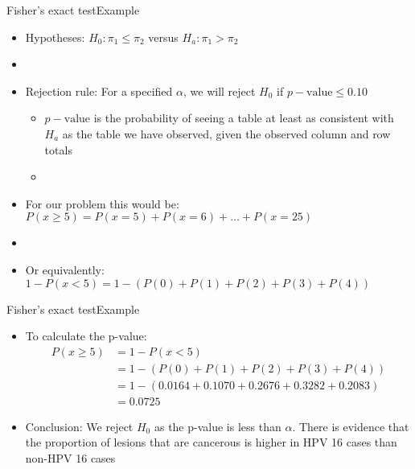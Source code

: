 \documentclass[xcolor=dvipsnames]{beamer}
\begin{document}
\begin{frame}{Fisher's exact test}{Example}
	\begin{itemize}
		\item Hypotheses: $H_0: \pi_1 \leq \pi_2$ versus $H_a: \pi_1 > \pi_2$
		\item[]
		\item Rejection rule: For a specified $\alpha$, we will reject $H_0$ if $p-\text{value} \leq 0.10$
		\begin{itemize}
			\item $p-\text{value}$ is the probability of seeing a table at least as consistent with $H_a$ as the table we have observed, given the observed column and row totals
			\item[]
		\end{itemize}
	\item For our problem this would be: $P(x \geq 5) = P(x = 5)+P(x = 6)+\hdots + P(x = 25)$
	\item[]
	\item Or equivalently:
	$1-P(x < 5) = 1-(P(0) + P(1) + P(2) + P(3) + P(4))$
	\end{itemize}
\end{frame}

\begin{frame}{Fisher's exact test}{Example}
	\begin{itemize}
		\item To calculate the p-value:
		\begin{align*}
			P(x \geq 5) &= 1-P(x < 5) \\
			&=1-(P(0) + P(1) + P(2) + P(3) + P(4)) \\ 
			&=1-(0.0164 + 0.1070 + 0.2676 + 0.3282 + 0.2083)  \\
			&=0.0725
		\end{align*}
		\item Conclusion: We reject $H_0$ as the p-value is less than $\alpha$. There is evidence that the proportion of lesions that are cancerous is higher in HPV 16 cases than non-HPV 16 cases
	\end{itemize}
\end{frame}
\end{document}
